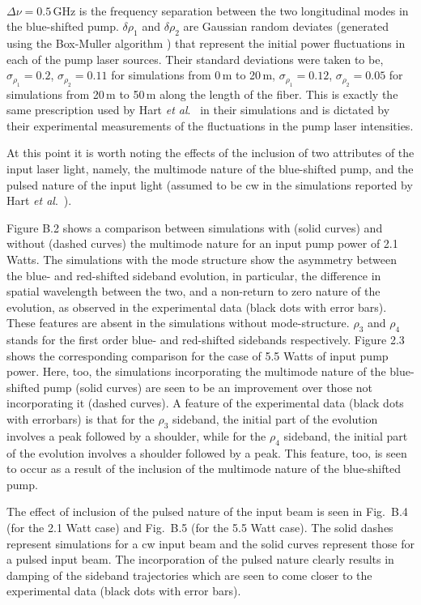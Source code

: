 \

\noindent $\Delta\nu = 0.5$\,GHz is the frequency separation between the two longitudinal 
modes in the blue-shifted pump. $\delta\rho_1$ and $\delta\rho_2$ are 
Gaussian random deviates (generated using the Box-Muller algorithm 
\cite{boxmuller}) that represent the initial power fluctuations in each of the 
pump laser sources. Their standard deviations were taken to be, 
$\sigma_{\rho_1} = 0.2$, $\sigma_{\rho_2} = 0.11$ for simulations from 0\,m to 
20\,m, $\sigma_{\rho_1} = 0.12$, $\sigma_{\rho_2} = 0.05$ for simulations from 
20\,m to 50\,m along the length of the fiber. This is exactly the same 
prescription used by Hart {\it et al}.\ \cite{hart1} in their simulations and is 
dictated by their experimental measurements of the fluctuations in the pump 
laser intensities.

At this point it is worth noting the effects of the inclusion of two attributes of 
the input laser light, namely, the multimode nature of the blue-shifted pump, and 
the pulsed nature of the input light (assumed to be cw in the simulations reported by 
Hart {\it et al}.\ \cite{hart1}). 

Figure B.2 shows a comparison between simulations with (solid curves) and without (dashed curves) the multimode nature for an input pump power of 2.1 Watts. The simulations with the mode structure show the asymmetry between the blue- and red-shifted sideband evolution, in particular, the difference in spatial wavelength between the two, and a non-return to zero nature of the evolution, as observed in the experimental data (black dots with error bars). These features are absent in the simulations without mode-structure. $\rho_3$ and $\rho_4$ stands for the first order blue- and red-shifted sidebands respectively.  Figure 2.3 shows the corresponding comparison for the case of 5.5 Watts of input pump power.  Here, too, the simulations incorporating the multimode nature of the blue-shifted pump (solid curves) are seen to be an improvement over those not incorporating it (dashed curves). A feature of the experimental data (black dots with errorbars) is that for the $\rho_3$ sideband, the initial part of the evolution involves a peak followed by a shoulder, while for the $\rho_4$ sideband, the initial part of the evolution involves a shoulder followed by a peak. This feature, too, is seen to occur as a result of the inclusion of the multimode nature of the blue-shifted pump.  

The effect of inclusion of the pulsed nature of the input beam is seen in Fig.\ B.4 (for the 2.1 Watt case) and Fig.\ B.5 (for the 5.5 Watt case). The solid dashes represent simulations for a cw input beam and the solid curves represent those for a pulsed input beam. The incorporation of the pulsed nature clearly results in damping of the sideband trajectories which are seen to come closer to the experimental data \cite{hart1} (black dots with error bars). 

